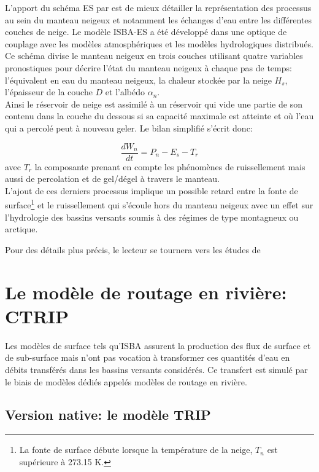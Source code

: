 \noindent L'apport du schéma ES par \citet{boone2001} est de mieux détailler la représentation des processus au sein du manteau neigeux et notamment les échanges d'eau entre les différentes couches de neige. Le modèle ISBA-ES a été développé dans une optique de couplage avec les modèles atmosphériques et les modèles hydrologiques distribués. Ce schéma divise le manteau neigeux en trois couches utilisant quatre variables pronostiques pour décrire l'état du manteau neigeux à chaque pas de temps: l'équivalent en eau du manteau neigeux, la chaleur stockée par la neige $H_{s}$, l'épaisseur de la couche $D$ et l'albédo $\alpha_{n}$.\\
Ainsi le réservoir de neige est assimilé à un réservoir qui vide une partie de son contenu dans la couche du dessous si sa capacité maximale est atteinte et où l'eau qui a percolé peut à nouveau geler. Le bilan simplifié s'écrit donc:

\begin{equation}
 \frac{dW_{n}}{dt}  = P_{n} - E_{s} - T_{r}
\end{equation}
avec $T_{r}$ la composante prenant en compte les phénomènes de ruissellement mais aussi de percolation et de gel/dégel à travers le manteau.\\

L'ajout de ces derniers processus implique un possible retard entre la fonte de surface\footnote{La fonte de surface débute lorsque la température de la neige, $T_{n}$ est supérieure à 273.15 K.} et le ruissellement qui s'écoule hors du manteau neigeux avec un effet sur l'hydrologie des bassins versants soumis à des régimes de type montagneux ou arctique.

Pour des détails plus précis, le lecteur se tournera vers les études de \citet{boone2001, vionnet2012, decharme2016}


\section{{\selectfont Le modèle de routage en rivière: CTRIP}}
\label{sec:CTRIP}

Les modèles de surface tels qu'ISBA assurent la production des flux de surface et de sub-surface mais n'ont pas vocation à transformer ces quantités d'eau en débits transférés dans les bassins versants considérés. Ce transfert est simulé par le biais de modèles dédiés appelés modèles de routage en rivière.

\subsection{\selectfont Version native: le modèle TRIP}

